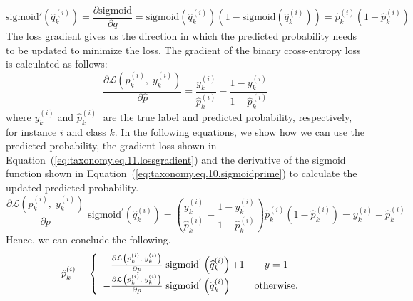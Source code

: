 \begin{equation}
    \label{eq:taxonomy.eq.10.sigmoidprime}
    \text{sigmoid}'\left(\widehat{q}_k^{(i)}\right)=\frac{\partial{\text{sigmoid}}}{\partial{q}}=\text{sigmoid}\left(\widehat{q}_k^{(i)}\right)\left(1-\text{sigmoid}\left(\widehat{q}_k^{(i)}\right)\right)=\widehat{p}_k^{(i)}\left(1-\widehat{p}_k^{(i)}\right)
\end{equation}
The loss gradient gives us the direction in which the predicted probability needs to be updated to minimize the loss. The gradient of the binary cross-entropy loss is calculated as follows:
\begin{equation}
    \label{eq:taxonomy.eq.11.lossgradient}
    \frac{\partial \mathcal{L} \left( \widehat{p}_k^{(i)},\;y_k^{(i)}\right)}{\partial \widehat{p}}=\frac{y_k^{(i)}}{\widehat{p}_k^{(i)}}-\frac{1-y_k^{(i)}}{1-\widehat{p}_k^{(i)}}
\end{equation}
where $y_k^{(i)}\; $and ${\widehat p}_k^{(i)}\; $ are the true label and predicted probability, respectively, for instance $i $ and class $k $.
In the following equations, we show how we can use the predicted probability, the gradient loss shown in Equation~(\ref{eq:taxonomy.eq.11.lossgradient}) and the derivative of the sigmoid function shown in Equation~(\ref{eq:taxonomy.eq.10.sigmoidprime}) to calculate the updated predicted probability.
\begin{equation}
\label{eq:taxonomy.eq.12.newpredelement}
\frac{\partial \mathcal{L}\left(p_k^{(i)},\; y_k^{(i)}\right)}{\partial p}\;\text{sigmoid}^{'}\left(\widehat{q}_k^{(i)}\right)=\left(\frac{y_k^{(i)}}{\widehat{p}_k^{(i)}}-\frac{1-y_k^{(i)}}{1-\widehat{p}_k^{(i)}}\right)\widehat{p}_k^{(i)}\left(1-\widehat{p}_k^{(i)}\right)=y_k^{(i)}-\widehat{p}_k^{(i)}
\end{equation}
Hence, we can conclude the following.
\begin{equation}
    \label{eq:taxonomy.eq.13.newpred}
    \begin{array}{@{}l}\hat{p}_{k}^{(i)} = \left\{\begin{array}{lc}-\frac{\partial \mathcal{L}\left(p_k^{(i)},\;y_k^{(i)}\right)}{\partial p}\;\text{sigmoid}^{'}\left(\widehat{q}_k^{(i)}\right)\text{+1} & y=1\\-\frac{\partial \mathcal{L}\left(p_k^{(i)},\;y_k^{(i)}\right)}{\partial p}\;\text{sigmoid}^{'}\left(\widehat{q}_k^{(i)}\right) & \text{otherwise.} \end{array}\right.\end{array}
\end{equation}
